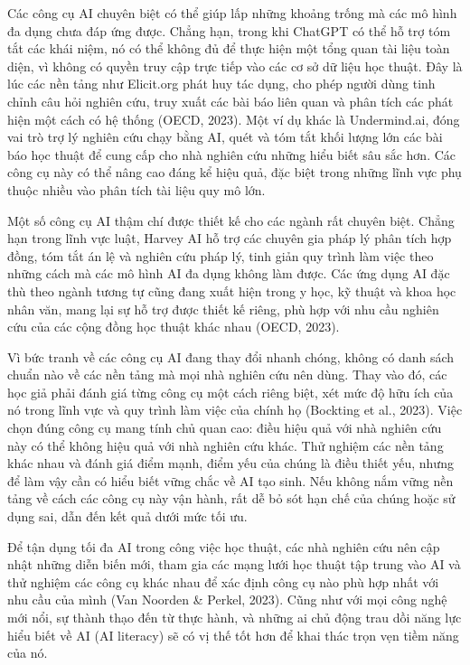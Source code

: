 Các công cụ AI chuyên biệt có thể giúp lấp những khoảng trống mà các mô hình đa dụng chưa đáp ứng được. Chẳng hạn, trong khi ChatGPT có thể hỗ trợ tóm tắt các khái niệm, nó có thể không đủ để thực hiện một tổng quan tài liệu toàn diện, vì không có quyền truy cập trực tiếp vào các cơ sở dữ liệu học thuật. Đây là lúc các nền tảng như Elicit.org phát huy tác dụng, cho phép người dùng tinh chỉnh câu hỏi nghiên cứu, truy xuất các bài báo liên quan và phân tích các phát hiện một cách có hệ thống (OECD, 2023). Một ví dụ khác là Undermind.ai, đóng vai trò trợ lý nghiên cứu chạy bằng AI, quét và tóm tắt khối lượng lớn các bài báo học thuật để cung cấp cho nhà nghiên cứu những hiểu biết sâu sắc hơn. Các công cụ này có thể nâng cao đáng kể hiệu quả, đặc biệt trong những lĩnh vực phụ thuộc nhiều vào phân tích tài liệu quy mô lớn.

Một số công cụ AI thậm chí được thiết kế cho các ngành rất chuyên biệt. Chẳng hạn trong lĩnh vực luật, Harvey AI hỗ trợ các chuyên gia pháp lý phân tích hợp đồng, tóm tắt án lệ và nghiên cứu pháp lý, tinh giản quy trình làm việc theo những cách mà các mô hình AI đa dụng không làm được. Các ứng dụng AI đặc thù theo ngành tương tự cũng đang xuất hiện trong y học, kỹ thuật và khoa học nhân văn, mang lại sự hỗ trợ được thiết kế riêng, phù hợp với nhu cầu nghiên cứu của các cộng đồng học thuật khác nhau (OECD, 2023).

Vì bức tranh về các công cụ AI đang thay đổi nhanh chóng, không có danh sách chuẩn nào về các nền tảng mà mọi nhà nghiên cứu nên dùng. Thay vào đó, các học giả phải đánh giá từng công cụ một cách riêng biệt, xét mức độ hữu ích của nó trong lĩnh vực và quy trình làm việc của chính họ (Bockting et al., 2023). Việc chọn đúng công cụ mang tính chủ quan cao: điều hiệu quả với nhà nghiên cứu này có thể không hiệu quả với nhà nghiên cứu khác. Thử nghiệm các nền tảng khác nhau và đánh giá điểm mạnh, điểm yếu của chúng là điều thiết yếu, nhưng để làm vậy cần có hiểu biết vững chắc về AI tạo sinh. Nếu không nắm vững nền tảng về cách các công cụ này vận hành, rất dễ bỏ sót hạn chế của chúng hoặc sử dụng sai, dẫn đến kết quả dưới mức tối ưu.

Để tận dụng tối đa AI trong công việc học thuật, các nhà nghiên cứu nên cập nhật những diễn biến mới, tham gia các mạng lưới học thuật tập trung vào AI và thử nghiệm các công cụ khác nhau để xác định công cụ nào phù hợp nhất với nhu cầu của mình (Van Noorden \& Perkel, 2023). Cũng như với mọi công nghệ mới nổi, sự thành thạo đến từ thực hành, và những ai chủ động trau dồi năng lực hiểu biết về AI (AI literacy) sẽ có vị thế tốt hơn để khai thác trọn vẹn tiềm năng của nó.

